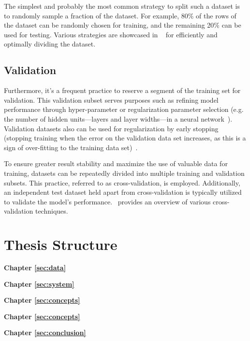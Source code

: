 The simplest and probably the most common strategy to split such a dataset is to randomly sample a fraction of the dataset. For example, 80\% of the rows of the dataset can be randomly chosen for training, and the remaining 20\% can be used for testing. Various strategies are showcased in ~\cite{roshan2022split} for efficiently and optimally dividing the dataset.

\subsection{Validation}
Furthermore, it's a frequent practice to reserve a segment of the training set for validation. This validation subset serves purposes such as refining model performance through hyper-parameter or regularization parameter selection (e.g. the number of hidden units—layers and layer widths—in a neural network~\cite{ripley2007pattern}). Validation datasets also can be used for regularization by early stopping (stopping training when the error on the validation data set increases, as this is a sign of over-fitting to the training data set)~\cite{Prechelt2012}.

To ensure greater result stability and maximize the use of valuable data for training, datasets can be repeatedly divided into multiple training and validation subsets. This practice, referred to as cross-validation, is employed. Additionally, an independent test dataset held apart from cross-validation is typically utilized to validate the model's performance.~\cite{browne2000cv} provides an overview of various cross-validation techniques.

\section{Thesis Structure}
\label{sec:intro:structure}

\textbf{Chapter \ref{sec:data}} \\[0.2em]
\blindtext

\textbf{Chapter \ref{sec:system}} \\[0.2em]
\blindtext

\textbf{Chapter \ref{sec:concepts}} \\[0.2em]
\blindtext

\textbf{Chapter \ref{sec:concepts}} \\[0.2em]
\blindtext

\textbf{Chapter \ref{sec:conclusion}} \\[0.2em]
\blindtext
